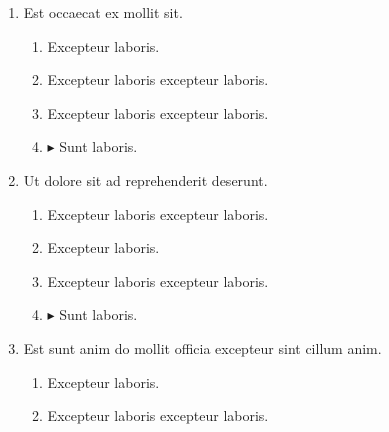 \documentclass[a4paper,12pt]{article}
\begin{document}
\begin{enumerate}[label=\textbf{\arabic*.}]
\begin{multicols}{2}
\begin{enumerate}
		\item  13pt
    
		\item  15pt
    
		\item $\blacktriangleright$  12pt
    
	\end{enumerate}

\end{multicols}
\item Est occaecat ex mollit sit.
\begin{multicols}{2}
	\begin{enumerate}
		\item  Excepteur laboris.
    
		\item  Excepteur laboris excepteur laboris.
    
		\item  Excepteur laboris excepteur laboris.
  
		\item $\blacktriangleright$  Sunt laboris.
    
	\end{enumerate}

\end{multicols}
\item Ut dolore sit ad reprehenderit deserunt.
\begin{multicols}{2}
	\begin{enumerate}
		\item  Excepteur laboris excepteur laboris.
    
		\item  Excepteur laboris.
    
		\item  Excepteur laboris excepteur laboris.
  
		\item $\blacktriangleright$  Sunt laboris.
    
	\end{enumerate}

\end{multicols}
\item Est sunt anim do mollit officia excepteur sint cillum anim.
\begin{multicols}{2}
	\begin{enumerate}
		\item  Excepteur laboris.
    
		\item  Excepteur laboris excepteur laboris.
    

\end{enumerate}
\end{multicols}
\end{enumerate}
\end{document}
